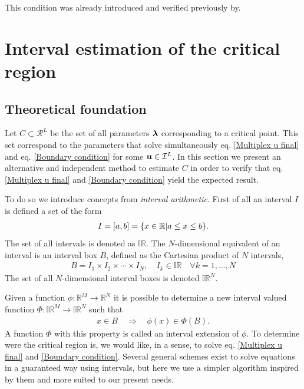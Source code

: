 \documentclass[
11pt, %
english, %
singlespacing, %
liststotoc, %
headsepline, %
]{MastersDoctoralThesis} %
\begin{document}
This condition was already introduced and verified previously by\missingref{}.

\section{Interval estimation of the critical region}

\subsection{Theoretical foundation}

Let $C \subset \mathcal{R}^L$ be the set of all parameters $\boldsymbol{\mathrm{\lambda}}$ corresponding to a critical point. This set correspond to the parameters that solve simultaneously eq. \eqref{Multiplex u final} and eq. \eqref{Boundary condition} for some $\boldsymbol{\mathrm{u}} \in \mathcal{I}^L$. In this section we present an alternative and independent method to estimate $C$ in order to verify that eq. \eqref{Multiplex u final} and \eqref{Boundary condition} yield the expected result.

To do so we introduce concepts from \emph{interval arithmetic}\missingref{}. First of all an interval $I$ is defined a set of the form
\begin{align}
	I = \left[a, b\right] = \{x \in \mathbb{R} | a \leq x \leq b\}.
\end{align}
The set of all intervals is denoted as $\mathbb{IR}$. The $N$-dimensional equivalent of an interval is an interval box $B$, defined as the Cartesian product of $N$ intervals,
\begin{align}
	B = I_1 \times I_2 \times \cdots \times I_N, \quad I_k \in \mathbb{IR} \quad \forall k = 1, \dots, N
\end{align}
The set of all $N$-dimensional interval boxes is denoted $\mathbb{IR}^N$.

Given a function $\phi : \mathbb{R}^M \rightarrow \mathbb{R}^N$ it is possible\missingref{} to determine a new interval valued function $\Phi : \mathbb{IR}^M \rightarrow \mathbb{IR}^N$ such that
\begin{align}
	x \in B \quad \Rightarrow \quad \phi(x) \in \Phi(B). \label{Definition interval extension}
\end{align}
A function $\Phi$ with this property is called an interval extension of $\phi$. To determine were the critical region is, we would like, in a sense, to solve eq. \eqref{Multiplex u final} and \eqref{Boundary condition}. Several general schemes exist to solve equations in a guaranteed way using intervals\missingref{}, but here we use a simpler algorithm inspired by them and more suited to our present needs.
\end{document}
